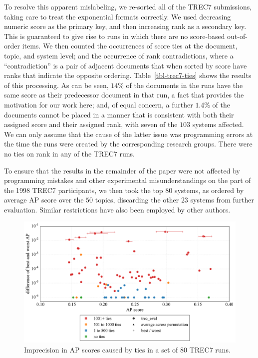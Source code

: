 To resolve this apparent mislabeling, we re-sorted all of the TREC7
submissions, taking care to treat the exponential formats correctly.
We used decreasing numeric score as the primary key, and then
increasing rank as a secondary key.
This is guaranteed to give rise to runs in which there are no
score-based out-of-order items.
We then counted the occurrences of score ties at the document, topic,
and system level; and the occurrence of rank contradictions, where a
``contradiction'' is a pair of adjacent documents that when sorted by
score have ranks that indicate the opposite ordering.
Table~\ref{tbl-trec7-ties} shows the results of this processing.
As can be seen, $14$\% of the documents in the runs have the same
score as their predecessor document in that run, a fact that provides
the motivation for our work here; and, of equal concern, a further
$1.4$\% of the documents cannot be placed in a manner that is
consistent with both their assigned score and their assigned rank,
with seven of the $103$ systems affected.
We can only assume that the cause of the latter issue was programming
errors at the time the runs were created by the corresponding
research groups.
There were no ties on rank in any of the TREC7 runs.

To ensure that the results in the remainder of the paper were not
affected by programming mistakes and other experimental
misunderstandings on the part of the 1998 TREC7 participants, we then
took the top $80$ systems, as ordered by average AP score over the
$50$ topics, discarding the other $23$ systems from further
evaluation.
Similar restrictions have also been employed by other authors.



\begin{figure}[t!]
\centering
\includegraphics[width=1\textwidth]{figs/fig-trec7-ap-scores.pdf}
\caption{Imprecision in AP scores caused by ties in a set of $80$
TREC7 runs.
\label{fig-trec7-ap-scores}}
\end{figure}

